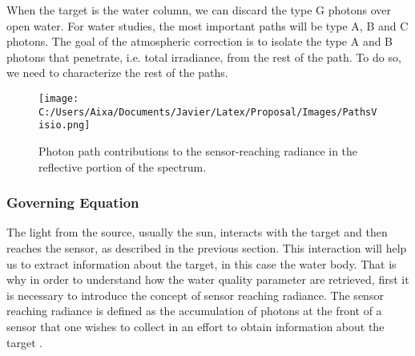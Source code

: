 When the target is the water column, we can discard the type G photons over open water. For water studies, the most important paths will be type A, B and C photons. The goal of the atmospheric correction is to isolate the type A and B photons that penetrate, i.e. total irradiance, from the rest of the path. To do so, we need to characterize the rest of the paths.

\begin{figure}[htb]
  \centering
  \texttt{[image: C:/Users/Aixa/Documents/Javier/Latex/Proposal/Images/PathsVisio.png]}
\caption{Photon path contributions to the sensor-reaching radiance in the reflective portion of the spectrum.}
\label{fig:paths} 
\end{figure}

\subsubsection{Governing Equation}

The light from the source, usually the sun, interacts with the target and then reaches the sensor, as described in the previous section. This interaction will help us to extract information about the target, in this case the water body. That is why in order to understand how the water quality parameter are retrieved, first it is necessary to introduce the concept of sensor reaching radiance. The sensor reaching radiance is defined as the accumulation of photons at the front of a sensor that one wishes to collect in an effort to obtain information about the target \cite{GeraceThesis}. 


